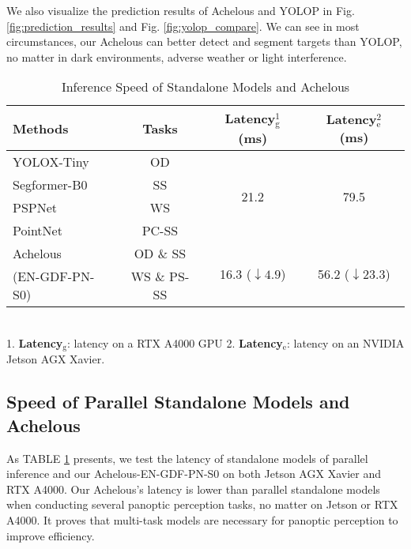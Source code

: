 \documentclass[letterpaper, 10 pt, conference]{ieeeconf}
\begin{document}
We also visualize the prediction results of Achelous and YOLOP in Fig. \ref{fig:prediction_results} and Fig. \ref{fig:yolop_compare}. We can see in most circumstances, our Achelous can better detect and segment targets than YOLOP, no matter in dark environments, adverse weather or light interference.

\begin{table}
\setlength\tabcolsep{2.3pt}
\caption{Inference Speed of Standalone Models and Achelous}
\centering
\label{tab:speed_compare}
\begin{tabular}{l|c|c|c}  
\toprule   
  \textbf{Methods} & \textbf{Tasks} & \textbf{Latency$_{\text{g}} ^1$ (ms)} & \textbf{Latency$_{\text{e}} ^2$ (ms)}  \\

\midrule
  YOLOX-Tiny \cite{ge2021yolox} & OD  & \multirow{4}[2]{*}{21.2}  & \multirow{4}[2]{*}{79.5}  \\
  Segformer-B0 \cite{xie2021segformer} & SS &  \\
  PSPNet \cite{zhao2017pyramid} & WS &   \\
  PointNet \cite{Charles_Su_Kaichun_Guibas_2017} & PC-SS &  \\
\midrule 
  Achelous & OD \& SS  & \multirow{2}[2]{*}{16.3 ($\downarrow 4.9$)}  &  \multirow{2}[2]{*}{56.2  ($\downarrow 23.3$)}   \\
     (EN-GDF-PN-S0)                                    &  WS \& PS-SS &      \\
  
\bottomrule  
\end{tabular}
\\
\vspace{1mm}
\footnotesize{1. \textbf{Latency$_{\text{g}}$}: latency on a RTX A4000 GPU 2. \textbf{Latency$_{\text{e}}$}: latency on an NVIDIA Jetson AGX Xavier.}\\
\end{table}

\subsection{Speed of Parallel Standalone Models and Achelous}
As TABLE \ref{tab:speed_compare} presents, we test the latency of standalone models of parallel inference and our Achelous-EN-GDF-PN-S0 on both Jetson AGX Xavier and RTX A4000. Our Achelous's latency is lower than parallel standalone models when conducting several panoptic perception tasks, no matter on Jetson or RTX A4000. It proves that multi-task models are necessary for panoptic perception to improve efficiency.
\end{document}
